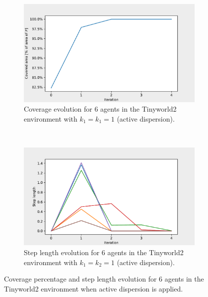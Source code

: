 \begin{figure}[H]
  \centering
  \begin{subfigure}[t]{0.5\textwidth}
    \centering
    \includegraphics[width=\textwidth]{figs/tinyworld2_6_agnt_k_1_1_k_2_1_area_traj.pdf}
    \caption{Coverage evolution for 6 agents in the Tinyworld2 environment with $k_{1} = k_{1} = 1$ (active dispersion).}
    \label{fig:6_agnt_tw2_k_1_1_a_traj}
  \end{subfigure}%
  ~ 
  \begin{subfigure}[t]{0.5\textwidth}
    \centering
    \includegraphics[width=\textwidth]{figs/tinyworld2_6_agnt_k_1_1_k_2_1_step_traj.pdf}
    \caption{Step length evolution for 6 agents in the Tinyworld2 environment with $k_{1} = k_{2} = 1$ (active dispersion).}
    \label{fig:6_agnt_tw2_k_1_1_s_traj}
  \end{subfigure}
  \caption{Coverage percentage and step length evolution for 6 agents in the Tinyworld2 environment when active dispersion is applied.}
  \label{fig:6_agnt_tw2_evolution_active}
\end{figure}
